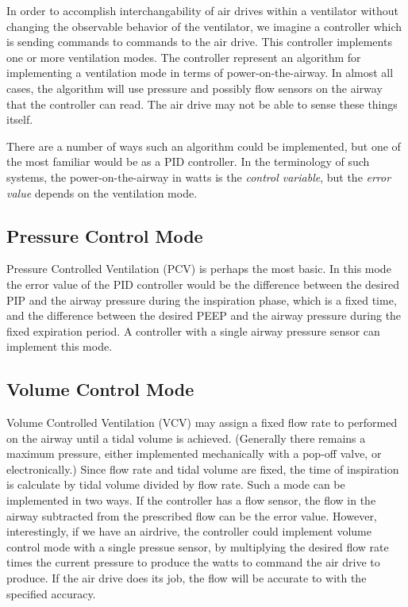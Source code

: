 \documentclass[conference]{article}
\begin{document}
In order to accomplish interchangability of air drives within a ventilator without
changing the observable behavior of the ventilator, we imagine a controller which
is sending commands to commands to the air drive.
This controller implements one or more ventilation modes.
The controller represent an algorithm for implementing a ventilation mode
in terms of power-on-the-airway. In almost all cases, the algorithm will use
pressure and possibly flow sensors on the airway that the controller can read.
The air drive may not be able to sense these things itself.

There are a number of ways such an algorithm could be implemented, but
one of the most familiar would be as a PID controller. In the terminology
of such systems, the power-on-the-airway in watts is the {\em control variable},
but the {\em error value} depends on the ventilation mode.

\subsection{Pressure Control Mode}

Pressure Controlled Ventilation (PCV) is perhaps the most basic.
In this mode the error value of the PID controller would be the difference
between the desired PIP and the airway pressure during the inspiration phase,
which is a fixed time, and the difference between the desired PEEP and the
airway pressure during the fixed expiration period. A controller with a single
airway pressure sensor can implement this mode.

\subsection{Volume Control Mode}

Volume Controlled Ventilation (VCV) may assign a fixed flow rate to
performed on the airway until a tidal volume is achieved.
(Generally there remains
a maximum pressure, either implemented mechanically with a pop-off valve,
or electronically.)
Since
flow rate and tidal volume are fixed, the time of inspiration
is calculate by tidal volume divided by flow rate.
Such a mode can be implemented in two ways. If the controller
has a flow sensor, the flow in the airway subtracted from the
prescribed flow can be the error value. However, interestingly, if
we have an airdrive, the controller could implement volume control mode with a single
pressue sensor, by multiplying the desired flow rate times the current pressure
to produce the watts to command the air drive to produce. If the air drive does its
job, the flow will be accurate to with the specified accuracy.
\end{document}
